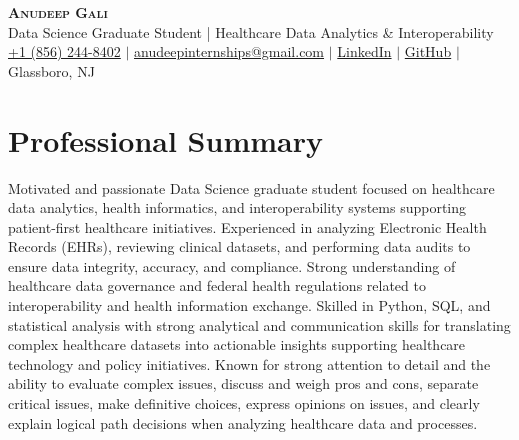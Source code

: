 \documentclass[letterpaper,11pt]{article}
\begin{document}
\begin{center}
  \textbf{\Huge \scshape Anudeep Gali} \\ \vspace{2pt}
  \normalsize Data Science Graduate Student | Healthcare Data Analytics \& Interoperability \\ \vspace{2pt}
  \small
  \faMobile \hspace{.5pt} \href{tel:+18562448402}{+1 (856) 244-8402}
  $|$
  \faAt \hspace{.5pt} \href{mailto:anudeepinternships@gmail.com}{anudeepinternships@gmail.com}
  $|$
  \faLinkedinSquare \hspace{.5pt} \href{https://www.linkedin.com/in/anudeep-gali-a52208207/}{LinkedIn}
  $|$
  \faGithub \hspace{.5pt} \href{https://github.com/anudeepus}{GitHub}
  $|$
  \faMapMarker \hspace{.5pt} Glassboro, NJ
\end{center}

\section{Professional Summary}
\vspace{1pt}
Motivated and passionate Data Science graduate student focused on healthcare data analytics, health informatics, and interoperability systems supporting patient-first healthcare initiatives. Experienced in analyzing Electronic Health Records (EHRs), reviewing clinical datasets, and performing data audits to ensure data integrity, accuracy, and compliance. Strong understanding of healthcare data governance and federal health regulations related to interoperability and health information exchange. Skilled in Python, SQL, and statistical analysis with strong analytical and communication skills for translating complex healthcare datasets into actionable insights supporting healthcare technology and policy initiatives. Known for strong attention to detail and the ability to evaluate complex issues, discuss and weigh pros and cons, separate critical issues, make definitive choices, express opinions on issues, and clearly explain logical path decisions when analyzing healthcare data and processes.

\end{document}
